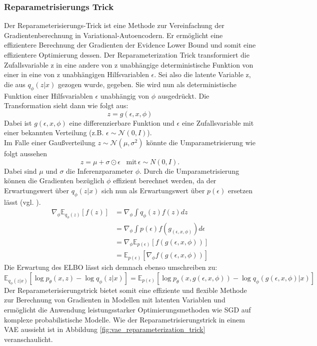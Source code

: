 \documentclass[%
thesis=student,%
coverpage=false,%
titlepage=false,%
headmarks=true, %
german,%
font=libertine, %
math=newpxtx, %
BCOR=5mm,%
coverBCOR=11mm%
]{tumbook}
\theoremstyle{break}
\begin{document}
\subsubsection{Reparametrisierungs Trick}
Der Reparameterisierungs-Trick ist eine Methode zur Vereinfachung der Gradientenberechnung in Variational-Autoencodern. Er ermöglicht eine effizientere Berechnung der Gradienten der Evidence Lower Bound und somit eine effizientere Optimierung dessen. Der Reparameterization Trick transformiert die Zufallsvariable z in eine andere von z unabhängige deterministische Funktion von einer in eine  von z unabhängigen Hilfsvariablen $\epsilon$.
Sei also die latente Variable z, die aus $q_\phi(z|x)$ gezogen wurde, gegeben. Sie wird nun als deterministische Funktion einer Hilfsvariablen $\epsilon$ unabhängig von $\phi$ ausgedrückt. 
Die Transformation sieht dann wie folgt aus:
$$ z = g(\epsilon, x, \phi)$$
Dabei ist $g(\epsilon,x,\phi) $ eine differenzierbare Funktion und $\epsilon$ eine Zufallsvariable mit einer bekannten Verteilung (z.B. $\epsilon \sim \mathcal{N}(0,I)$).\\
Im Falle einer Gaußverteilung $z \sim \mathcal{N}(\mu, \sigma^2)$ könnte die Umparametrisierung wie folgt aussehen 
$$z=\mu + \sigma \odot \epsilon \hspace{10pt}\text{mit} \hspace{2pt} \epsilon\sim N(0,I).$$ 
Dabei sind $\mu$ und $\sigma$ die Inferenzparameter $\phi$.  Durch die Umparametrisierung können die Gradienten bezüglich $\phi$ effizient berechnet werden, da der Erwartungswert über $q_\phi(z|x)$ sich nun als Erwartungswert über $p(\epsilon)$ ersetzen lässt (vgl. \cite{MonteCarloEstimation}).
\begin{align}
	\nabla_\phi \mathbb{E}_{q_\phi(z)}[f(z)] &= \nabla_\phi \int q_\phi(z) f(z) dz \\
	&= \nabla_\phi \int p(\epsilon) f(g_(\epsilon,x,\phi)) d\epsilon \\
	&= \nabla_\phi \mathbb{E}_{p(\epsilon)}[f(g(\epsilon,x, \phi))] \\
	& = \mathbb{E}_{p(\epsilon)}[\nabla_\phi f(g(\epsilon,x, \phi))]
\end{align}
Die Erwartung des ELBO lässt sich demnach ebenso umschreiben zu: 
$$  \mathbb{E}_{q_\phi(z|x)}\left[\log p_\theta(x,z)- \log q_\phi(z|x)\right] =  \mathbb{E}_{p(\epsilon)}\left[\log p_\theta(x,g(\epsilon,x, \phi))- \log q_\phi(g(\epsilon,x, \phi)|x)\right] $$
Der Reparameterisierungstrick bietet somit eine effiziente und flexible Methode zur Berechnung von Gradienten in Modellen mit latenten Variablen und ermöglicht die Anwendung leistungsstarker Optimierungsmethoden wie SGD auf komplexe probabilistische Modelle. Wie der Reparametrisierungstrick in einem VAE aussieht ist in  Abbildung \ref{fig:vae_reparameterization_trick} veranschaulicht.
\end{document}

